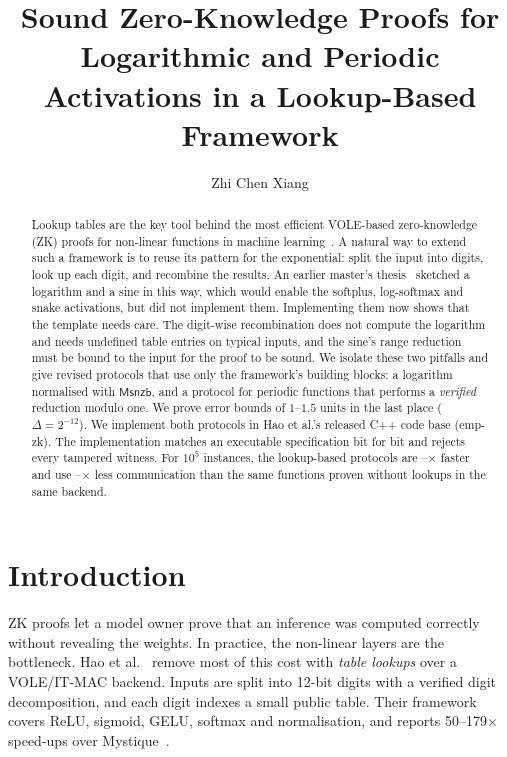 \documentclass[10pt,twocolumn]{article}
\title{\Large\bfseries Sound Zero-Knowledge Proofs for Logarithmic and Periodic\\ Activations in a Lookup-Based Framework}
\author{Zhi Chen Xiang}
\date{}
\theoremstyle{remark}
\newcommand{\Msnzb}{\mathsf{Msnzb}}
\newcommand{\ulp}{\Delta}
\begin{document}
\maketitle

\begin{abstract}
Lookup tables are the key tool behind the most efficient VOLE-based zero-knowledge (ZK) proofs for
non-linear functions in machine learning~\cite{hao2024scalable}. A natural way to extend such a
framework is to reuse its pattern for the exponential: split the input into digits, look up each
digit, and recombine the results. An earlier master's thesis~\cite{chen2025thesis} sketched a
logarithm and a sine in this way, which would enable the softplus, log-softmax and snake
activations, but did not implement them. Implementing them now shows that the template needs care.
The digit-wise recombination does not compute the logarithm and needs undefined table entries on
typical inputs, and the sine's range reduction must be bound to the input for the proof to be
sound. We isolate these two pitfalls and give revised protocols that use only the framework's
building blocks: a logarithm normalised with $\Msnzb$, and a protocol for periodic functions that performs a
\emph{verified} reduction modulo one. We prove error bounds of $1$--$1.5$ units in the last place
($\ulp=2^{-12}$). We implement both protocols in Hao et al.'s released C++ code base (emp-zk). The implementation matches an
executable specification bit for bit and rejects every tampered witness. For $10^5$ instances, the
lookup-based protocols are \SpeedMin--\SpeedMax$\times$ faster and use
\CommMin--\CommMax$\times$ less communication than the same functions proven without lookups in
the same backend.
\end{abstract}

\section{Introduction}

ZK proofs let a model owner prove that an inference was computed correctly without revealing
the weights. In practice, the non-linear layers are the bottleneck. Hao et al.~\cite{hao2024scalable}
remove most of this cost with \emph{table lookups} over a VOLE/IT-MAC backend. Inputs are split into
12-bit digits with a verified digit decomposition, and each digit indexes a small public table.
Their framework covers ReLU, sigmoid, GELU, softmax and normalisation, and reports
50--179$\times$ speed-ups over Mystique~\cite{weng2021mystique}.
\end{document}

